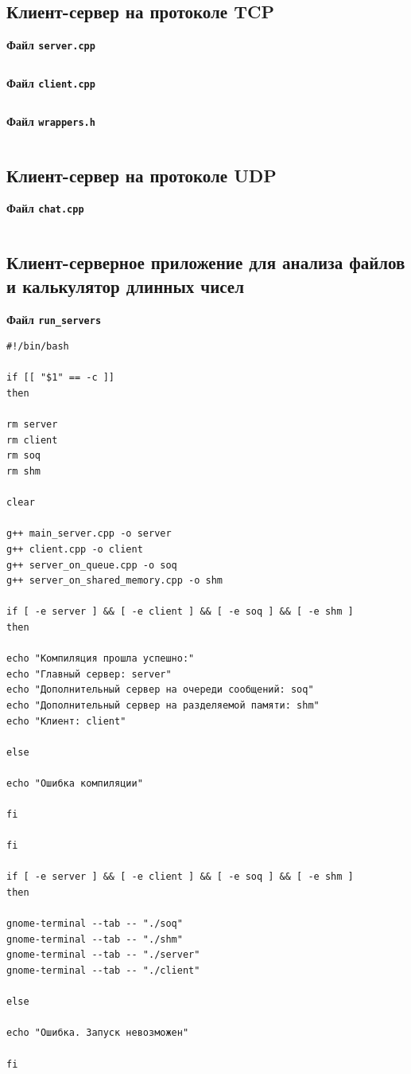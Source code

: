 \documentclass[a4paper,14pt]{extarticle}
\begin{document}
\subsection{Клиент-сервер на протоколе TCP}\label{code:lab4_1}
\centerline{\textbf{Файл \texttt{server.cpp}}}

\inputminted{octave}{server41.cpp}

\centerline{\textbf{Файл \texttt{client.cpp}}}

\inputminted{octave}{client41.cpp}

\centerline{\textbf{Файл \texttt{wrappers.h}}}

\inputminted{octave}{wrappers41.h}

\subsection{Клиент-сервер на протоколе UDP}\label{code:lab4_2}
\centerline{\textbf{Файл \texttt{chat.cpp}}}

\inputminted{octave}{chat.cpp}

\subsection{Клиент-серверное приложение для анализа файлов и калькулятор длинных чисел}\label{code:soft}

\centerline{\textbf{Файл \texttt{run\_servers}}}

\begin{verbatim}
#!/bin/bash

if [[ "$1" == -c ]]
then

rm server
rm client
rm soq
rm shm

clear

g++ main_server.cpp -o server
g++ client.cpp -o client
g++ server_on_queue.cpp -o soq
g++ server_on_shared_memory.cpp -o shm

if [ -e server ] && [ -e client ] && [ -e soq ] && [ -e shm ]
then

echo "Компиляция прошла успешно:"
echo "Главный сервер: server"
echo "Дополнительный сервер на очереди сообщений: soq"
echo "Дополнительный сервер на разделяемой памяти: shm"
echo "Клиент: client"

else

echo "Ошибка компиляции"

fi

fi

if [ -e server ] && [ -e client ] && [ -e soq ] && [ -e shm ]
then

gnome-terminal --tab -- "./soq"
gnome-terminal --tab -- "./shm"
gnome-terminal --tab -- "./server"
gnome-terminal --tab -- "./client"

else

echo "Ошибка. Запуск невозможен"

fi
\end{verbatim}
\end{document}
